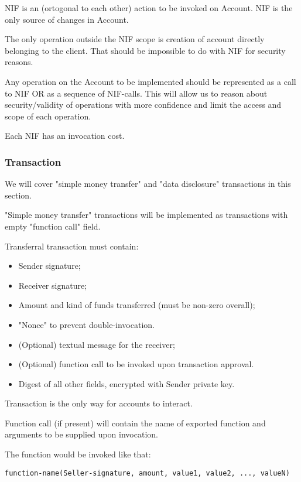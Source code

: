 NIF is an (ortogonal to each other) action to be invoked on Account.
NIF is the only source of changes in Account.

The only operation outside the NIF scope is creation of account directly belonging to the client.
That should be impossible to do with NIF for security reasons.

Any operation on the Account to be implemented should be represented as a call to NIF OR as a sequence of NIF-calls.
This will allow us to reason about security/validity of operations with more confidence and limit the access and scope of each operation.

Each NIF has an invocation cost.

\subsubsection{Transaction}

We will cover "simple money transfer" and "data disclosure" transactions in this section.

"Simple money transfer" transactions will be implemented as transactions with empty "function call" field.

Transferral transaction must contain:
\begin{itemize}
  \item Sender signature;
  \item Receiver signature;
  \item Amount and kind of funds transferred (must be non-zero overall);
  \item "Nonce" to prevent double-invocation.
  \item (Optional) textual message for the receiver;
  \item (Optional) function call to be invoked upon transaction approval.
  \item Digest of all other fields, encrypted with Sender private key.
\end{itemize}

Transaction is the only way for accounts to interact.

Function call (if present) will contain the name of exported function and arguments to be supplied upon invocation.

The function would be invoked like that:

\begin{verbatim}
function-name(Seller-signature, amount, value1, value2, ..., valueN)
\end{verbatim}

